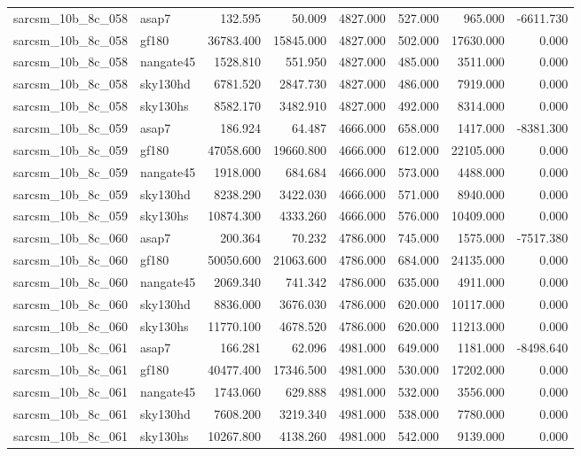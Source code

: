 \begin{tabular}{llrrrrrr}
sarcsm\_10b\_8c\_058 & asap7 & 132.595 & 50.009 & 4827.000 & 527.000 & 965.000 & -6611.730 \\
sarcsm\_10b\_8c\_058 & gf180 & 36783.400 & 15845.000 & 4827.000 & 502.000 & 17630.000 & 0.000 \\
sarcsm\_10b\_8c\_058 & nangate45 & 1528.810 & 551.950 & 4827.000 & 485.000 & 3511.000 & 0.000 \\
sarcsm\_10b\_8c\_058 & sky130hd & 6781.520 & 2847.730 & 4827.000 & 486.000 & 7919.000 & 0.000 \\
sarcsm\_10b\_8c\_058 & sky130hs & 8582.170 & 3482.910 & 4827.000 & 492.000 & 8314.000 & 0.000 \\
sarcsm\_10b\_8c\_059 & asap7 & 186.924 & 64.487 & 4666.000 & 658.000 & 1417.000 & -8381.300 \\
sarcsm\_10b\_8c\_059 & gf180 & 47058.600 & 19660.800 & 4666.000 & 612.000 & 22105.000 & 0.000 \\
sarcsm\_10b\_8c\_059 & nangate45 & 1918.000 & 684.684 & 4666.000 & 573.000 & 4488.000 & 0.000 \\
sarcsm\_10b\_8c\_059 & sky130hd & 8238.290 & 3422.030 & 4666.000 & 571.000 & 8940.000 & 0.000 \\
sarcsm\_10b\_8c\_059 & sky130hs & 10874.300 & 4333.260 & 4666.000 & 576.000 & 10409.000 & 0.000 \\
sarcsm\_10b\_8c\_060 & asap7 & 200.364 & 70.232 & 4786.000 & 745.000 & 1575.000 & -7517.380 \\
sarcsm\_10b\_8c\_060 & gf180 & 50050.600 & 21063.600 & 4786.000 & 684.000 & 24135.000 & 0.000 \\
sarcsm\_10b\_8c\_060 & nangate45 & 2069.340 & 741.342 & 4786.000 & 635.000 & 4911.000 & 0.000 \\
sarcsm\_10b\_8c\_060 & sky130hd & 8836.000 & 3676.030 & 4786.000 & 620.000 & 10117.000 & 0.000 \\
sarcsm\_10b\_8c\_060 & sky130hs & 11770.100 & 4678.520 & 4786.000 & 620.000 & 11213.000 & 0.000 \\
sarcsm\_10b\_8c\_061 & asap7 & 166.281 & 62.096 & 4981.000 & 649.000 & 1181.000 & -8498.640 \\
sarcsm\_10b\_8c\_061 & gf180 & 40477.400 & 17346.500 & 4981.000 & 530.000 & 17202.000 & 0.000 \\
sarcsm\_10b\_8c\_061 & nangate45 & 1743.060 & 629.888 & 4981.000 & 532.000 & 3556.000 & 0.000 \\
sarcsm\_10b\_8c\_061 & sky130hd & 7608.200 & 3219.340 & 4981.000 & 538.000 & 7780.000 & 0.000 \\
sarcsm\_10b\_8c\_061 & sky130hs & 10267.800 & 4138.260 & 4981.000 & 542.000 & 9139.000 & 0.000 \\

\end{tabular}
